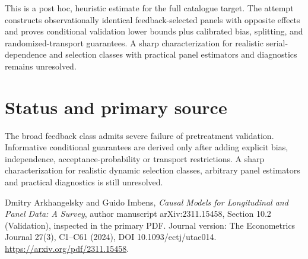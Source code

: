 \documentclass[11pt]{article}
\begin{document}
This is a post hoc, heuristic estimate for the full catalogue target.
The attempt constructs observationally identical feedback-selected panels with opposite effects and proves conditional validation lower bounds plus calibrated bias, splitting, and randomized-transport guarantees. A sharp characterization for realistic serial-dependence and selection classes with practical panel estimators and diagnostics remains unresolved.

\section*{Status and primary source}
The broad feedback class admits severe failure of pretreatment validation. Informative conditional guarantees are derived only after adding explicit bias, independence, acceptance-probability or transport restrictions. A sharp characterization for realistic dynamic selection classes, arbitrary panel estimators and practical diagnostics is still unresolved.

Dmitry Arkhangelsky and Guido Imbens, \emph{Causal Models for Longitudinal and Panel Data: A Survey}, author manuscript arXiv:2311.15458, Section 10.2 (Validation), inspected in the primary PDF. Journal version: The Econometrics Journal 27(3), C1--C61 (2024), DOI 10.1093/ectj/utae014. \url{https://arxiv.org/pdf/2311.15458}.
\end{document}
